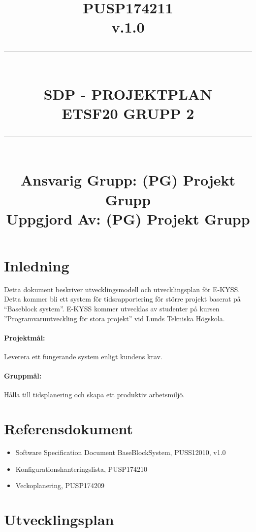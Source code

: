 \documentclass[paper=a4, fontsize=11pt,twoside]{article}
\title{
		\documentNumber{#1}																						
		\documentVersion{#2}																				
		\HRule{0.5pt} \\ %
		\LARGE \textbf{\uppercase{#3}} \\
		\large \textbf{\uppercase{ETSF20 Grupp 2}} 
		\HRule{2pt} \\ [1.5cm]    
		\normalsize            
		\documentResponsible{#4} \\ 
		\documentCreator{#4}  
	}
\newcommand{\HRule}[1]{\rule{\linewidth}{#1}}
\newcommand{\documentNumber}[1]{\centering PUSP1742#1 \\[1.0cm]}
\newcommand{\documentVersion}[1]{\centering \small{v.#1} \\[1.0cm]}
\newcommand{\documentResponsible}[1]{\centering  Ansvarig Grupp: #1}
\newcommand{\documentCreator}[1]{\centering Uppgjord Av: #1}
\newcommand{\grouptitlepage}[4]{ 
	\title{
		\documentNumber{#1}																						
		\documentVersion{#2}																				
		\HRule{0.5pt} \\ %
		\LARGE \textbf{\uppercase{#3}} \\
		\large \textbf{\uppercase{ETSF20 Grupp 2}} 
		\HRule{2pt} \\ [1.5cm]    
		\normalsize            
		\documentResponsible{#4} \\ 
		\documentCreator{#4}  
	}																							
	\maketitle																							
	\thispagestyle{empty} 																					
	\newpage 
}
\begin{document}
\grouptitlepage
{11}
{1.0}
{SDP - Projektplan}
{(PG) Projekt Grupp}	
\tableofcontents
\section{Inledning}
Detta dokument beskriver utvecklingsmodell och utvecklingsplan för E-KYSS. Detta kommer bli ett system för tidsrapportering för större projekt baserat på ``Baseblock system''. E-KYSS kommer utvecklas av studenter på kursen ''Programvaruutveckling för stora projekt'' vid Lunds Tekniska Högskola.
\paragraph{Projektmål:} Leverera ett fungerande system enligt kundens krav.
\paragraph{Gruppmål:} Hålla till tidsplanering och skapa ett produktiv arbetsmiljö.

\section{Referensdokument}
\begin{itemize}
\item Software Specification Document BaseBlockSystem, PUSS12010, v1.0
\item Konfigurationshanteringslista, PUSP174210
\item Veckoplanering, PUSP174209 
\end{itemize}
\section{Utvecklingsplan}
\end{document}
